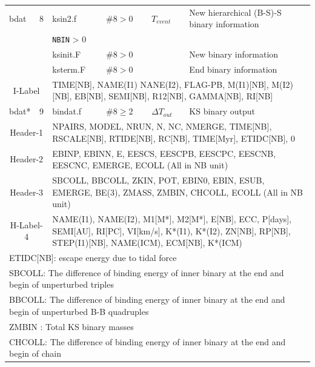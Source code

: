 \begin{longtable}{||p{0.42in}|p{0.25in}|p{0.6in}|p{0.6in}|p{0.4in}|p{2.3in}||}
    bdat   & 8   & ksin2.f    & $\#8>0$    & $T_{event}$  & New hierarchical (B-S)-S binary information  \\
    & &  \texttt{NBIN} > 0 & & &
    \\\hline
           &     & ksinit.F   & $\#8>0$    &             & New binary information       \\\hline
           &     & ksterm.F   & $\#8>0$    &             & End binary information       \\\hline
\multicolumn{2}{|c|}{ I-Label } & \multicolumn{4}{|p{4.4in}|}{ TIME[NB], NAME(I1) NANE(I2), FLAG-PB, M(I1)[NB], M(I2)[NB], EB[NB], SEMI[NB], R12[NB], GAMMA[NB], RI[NB] }\\\hline\hline

    bdat*  & 9   & bindat.f   & $\#8\geq2$   & $\Delta T_{out}$      & KS binary output            \\\hline
\multicolumn{2}{|c|}{ Header-1 } & \multicolumn{4}{|p{4.4in}|}{ NPAIRS, MODEL, NRUN, N, NC, NMERGE, TIME[NB], RSCALE[NB], RTIDE[NB], RC[NB], TIME[Myr], ETIDC[NB], 0}\\\hline
\multicolumn{2}{|c|}{ Header-2 } & \multicolumn{4}{|p{4.4in}|}{ EBINP, EBINN, E, EESCS, EESCPB, EESCPC, EESCNB, EESCNC, EMERGE, ECOLL (All in NB unit)}\\\hline
\multicolumn{2}{|c|}{ Header-3 } & \multicolumn{4}{|p{4.4in}|}{ SBCOLL, BBCOLL, ZKIN, POT, EBIN0, EBIN, ESUB, EMERGE, BE(3), ZMASS, ZMBIN, CHCOLL, ECOLL (All in NB unit)}\\\hline
\multicolumn{2}{|c|}{ H-Label-4 }& \multicolumn{4}{|p{4.4in}|}{ NAME(I1), NAME(I2), M1[M*], M2[M*], E[NB], ECC, P[days], SEMI[AU], RI[PC], VI[km/s], K*(I1), K*(I2), ZN[NB], RP[NB], STEP(I1)[NB], NAME(ICM), ECM[NB], K*(ICM)}\\ \hline
\multicolumn{6}{|p{5.4in}|}{ETIDC[NB]: escape energy due to tidal force  }\\
\multicolumn{6}{|p{5.4in}|}{SBCOLL: The difference of binding energy of inner binary at the end and begin of unperturbed triples}\\
\multicolumn{6}{|p{5.4in}|}{BBCOLL: The difference of binding energy of inner binary at the end and begin of unperturbed B-B quadruples} \\
\multicolumn{6}{|p{5.4in}|}{ZMBIN : Total KS binary masses }\\
\multicolumn{6}{|p{5.4in}|}{CHCOLL: The difference of binding energy of inner binary at the end and begin of chain} \\
\hline\hline


\end{longtable}
